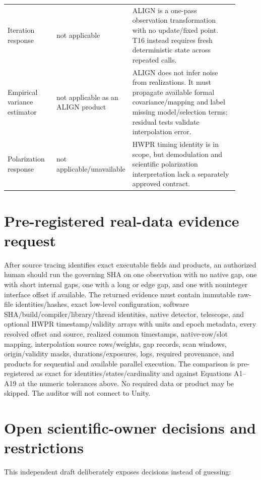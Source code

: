 \documentclass[11pt]{article}
\begin{document}
\begin{longtable}{L{0.22\linewidth}L{0.16\linewidth}L{0.53\linewidth}}
Iteration response & not applicable & ALIGN is a one-pass observation transformation with no update/fixed point.  T16 instead requires fresh deterministic state across repeated calls.\\
Empirical variance estimator & not applicable as an ALIGN product & ALIGN does not infer noise from realizations.  It must propagate available formal covariance/mapping and label missing model/selection terms; residual tests validate interpolation error.\\
Polarization response & not applicable/unavailable & HWPR timing identity is in scope, but demodulation and scientific polarization interpretation lack a separately approved contract.\\
\bottomrule
\end{longtable}

\section{Pre-registered real-data evidence request}

After source tracing identifies exact executable fields and products, an
authorized human should run the governing SHA on one observation with no
native gap, one with short internal gaps, one with a long or edge gap, and one
with noninteger interface offset if available.  The returned evidence must
contain immutable raw-file identities/hashes, exact low-level configuration,
software SHA/build/compiler/library/thread identities, native detector,
telescope, and optional HWPR timestamp/validity arrays with units and epoch
metadata, every resolved offset and source, realized common timestamps,
native-row/slot mapping, interpolation source rows/weights, gap records, scan
windows, origin/validity masks, durations/exposures, logs, required
provenance, and products for sequential and available parallel execution.
The comparison is pre-registered as exact for identities/states/cardinality
and against Equations A1--A19 at the numeric tolerances above.  No required
data or product may be skipped.  The auditor will not connect to Unity.

\section{Open scientific-owner decisions and restrictions}

This independent draft deliberately exposes decisions instead of guessing:
\end{document}
